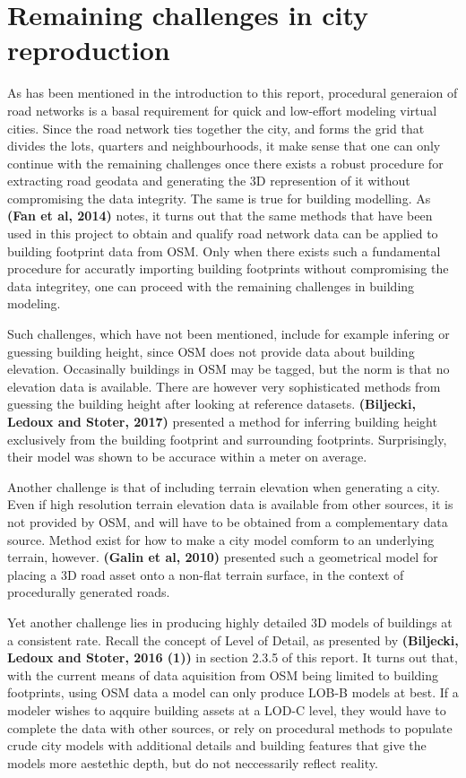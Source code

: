 \documentclass{kththesis}
\begin{document}

\section{Remaining challenges in city reproduction}

As has been mentioned in the introduction to this report, procedural generaion of road networks is a basal requirement for quick and low-effort modeling virtual cities.
Since the road network ties together the city, and forms the grid that divides the lots, quarters and neighbourhoods, it make sense that one can only continue with the remaining challenges once there exists a robust procedure for extracting road geodata and generating the 3D represention of it without compromising the data integrity. 
The same is true for building modelling.
As \textbf{(Fan et al, 2014)} notes, it turns out that the same methods that have been used in this project to obtain and qualify road network data can be applied to building footprint data from OSM. 
Only when there exists such a fundamental procedure for accuratly importing building footprints without compromising the data integritey, one can proceed with the remaining challenges in building modeling.

Such challenges, which have not been mentioned, include for example infering or guessing building height, since OSM does not provide data about building elevation.
Occasinally buildings in OSM may be tagged, but the norm is that no elevation data is available.
There are however very sophisticated methods from guessing the building height after looking at reference datasets.
\textbf{(Biljecki, Ledoux and Stoter, 2017)} presented a method for inferring building height exclusively from the building footprint and surrounding footprints.
Surprisingly, their model was shown to be accurace within a meter on average.

Another challenge is that of including terrain elevation when generating a city.
Even if high resolution terrain elevation data is available from other sources, it is not provided by OSM, and will have to be obtained from a complementary data source.
Method exist for how to make a city model comform to an underlying terrain, however.
\textbf{(Galin et al, 2010)} presented such a geometrical model for placing a 3D road asset onto a non-flat terrain surface, in the context of procedurally generated roads.

Yet another challenge lies in producing highly detailed 3D models of buildings at a consistent rate.
Recall the concept of Level of Detail, as presented by \textbf{(Biljecki, Ledoux and Stoter, 2016 (1))} in section 2.3.5 of this report.
It turns out that, with the current means of data aquisition from OSM being limited to building footprints, using OSM data a model can only produce LOB-B models at best.
If a modeler wishes to aqquire building assets at a LOD-C level, they would have to complete the data with other sources, or rely on procedural methods to populate crude city models with additional details and building features that give the models more aestethic depth, but do not neccessarily reflect reality.
\end{document}
